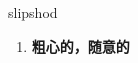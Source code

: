 
\begin{frame}
{\huge slipshod}
\begin{center}
\begin{enumerate}\Large
  \item \textbf{粗心的，随意的}
\end{enumerate}
\end{center}
\end{frame}
